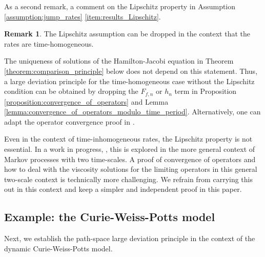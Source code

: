 \documentclass[a4paper]{article}
\numberwithin{equation}{section}
\theoremstyle{definition}
\newtheorem{remark}[theorem]{Remark}
\begin{document}
As a second remark, a comment on the Lipschitz property in Assumption \ref{assumption:jump_rates} \ref{item:results_Lipschitz}.

\begin{remark}
	The Lipschitz assumption can be dropped in the context that the rates are time-homogeneous. 
	
	The uniqueness of solutions of the Hamilton-Jacobi equation in Theorem \ref{theorem:comparison_principle} below does not depend on this statement. Thus, a large deviation principle for the time-homogeneous case without the Lipschitz condition can be obtained by dropping the $F_{f,n}$ or $h_n$ term in Proposition \ref{proposition:convergence_of_operators} and Lemma \ref{lemma:convergence_of_operators_modulo_time_period}. Alternatively, one can adapt the operator convergence proof in \cite{Kr16b}.
	
	Even in the context of  time-inhomogeneous rates, the Lipschitz property is not essential. In a work in progress, \cite{KrSchl20}, this is explored in the more general context of Markov processes with two time-scales. A proof of convergence of operators and how to deal with the viscosity solutions for the limiting operators in this general two-scale context is technically more challenging. We refrain from carrying this out in this context and keep a simpler and independent proof in this paper.
\end{remark}









\subsection{Example: the Curie-Weiss-Potts model} \label{section:examples}

Next, we establish the path-space large deviation principle in the context of the dynamic Curie-Weiss-Potts model.
\end{document}
